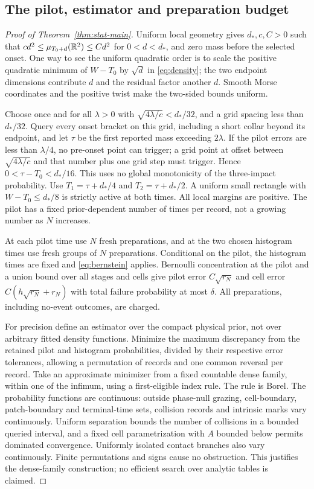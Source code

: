 \subsection{The pilot, estimator and preparation budget}
\begin{proof}[Proof of Theorem~\ref{thm:stat-main}]
Uniform local geometry gives $d_*,c,C>0$ such that
$cd^2\le\mu_{T_0+d}(\mathbb R^2)\le Cd^2$ for $0<d<d_*$, and zero mass
before the selected onset. One way to see the uniform quadratic order
is to scale the positive quadratic minimum of $W-T_0$ by $\sqrt d$
in \eqref{eq:density}; the two endpoint dimensions contribute $d$ and
the residual factor another $d$. Smooth Morse coordinates and the
positive twist make the two-sided bounds uniform.

Choose once and for all $\lambda>0$ with
$\sqrt{4\lambda/c}<d_*/32$, and a grid spacing less than $d_*/32$.
Query every onset bracket on this grid, including a short collar beyond
its endpoint, and let $\tau$ be the first reported mass exceeding
$2\lambda$. If the pilot errors are less than $\lambda/4$, no pre-onset
point can trigger; a grid point at offset between
$\sqrt{4\lambda/c}$ and that number plus one grid step must trigger.
Hence $0<\tau-T_0<d_*/16$. This uses no global monotonicity of the
three-impact probability. Use
$T_1=\tau+d_*/4$ and $T_2=\tau+d_*/2$. A uniform small rectangle
with $W-T_0\le d_*/8$ is strictly active at both times. All local
margins are positive. The pilot has a fixed prior-dependent number of
times per record, not a growing number as $N$ increases.

At each pilot time use $N$ fresh preparations, and at the two chosen
histogram times use fresh groups of $N$ preparations. Conditional on the
pilot, the histogram times are fixed and \eqref{eq:bernstein} applies.
Bernoulli concentration at the pilot and a union bound over all stages
and cells give pilot error $C\sqrt{r_N}$ and cell error
$C(h\sqrt{r_N}+r_N)$ with total failure probability at most $\delta$.
All preparations, including no-event outcomes, are charged.

For precision define an estimator over the compact physical prior, not
over arbitrary fitted density functions. Minimize the maximum discrepancy
from the retained pilot and histogram probabilities, divided by their
respective error tolerances, allowing a permutation of records and one
common reversal per record. Take an approximate minimizer from a fixed
countable dense family, within one of the infimum, using a first-eligible
index rule. The rule is Borel. The probability functions are continuous:
outside phase-null grazing, cell-boundary, patch-boundary and terminal-time
sets, collision records and intrinsic marks vary continuously. Uniform
separation bounds the number of collisions in a bounded queried interval,
and a fixed cell parametrization with $A$ bounded below permits dominated
convergence. Uniformly isolated contact branches also vary continuously.
Finite permutations and signs cause no obstruction. This justifies the
dense-family construction; no efficient search over analytic tables is
claimed.


\end{proof}
